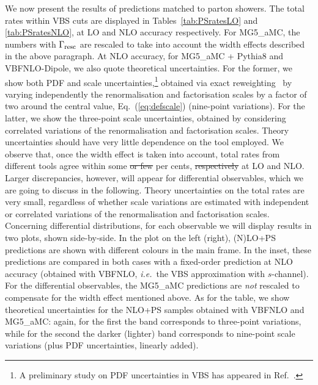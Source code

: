\documentclass[twocolumn,epjc3]{svjour3} %
\newlength{\width}
\providecommand{\DIFaddtex}[1]{{\protect\color{blue}\uwave{#1}}} %
\providecommand{\DIFdeltex}[1]{{\protect\color{red}\sout{#1}}}                      %
\providecommand{\DIFaddbegin}{} %
\providecommand{\DIFaddend}{} %
\providecommand{\DIFdelbegin}{} %
\providecommand{\DIFdelend}{} %
\providecommand{\DIFadd}[1]{\texorpdfstring{\DIFaddtex{#1}}{#1}} %
\providecommand{\DIFdel}[1]{\texorpdfstring{\DIFdeltex{#1}}{}} %
\begin{document}
We now present the results of predictions matched to parton showers.
The total rates within VBS cuts are displayed in Tables~\ref{tab:PSratesLO} and
\ref{tab:PSratesNLO}, at LO and NLO
accuracy respectively. For {\sc MG5\_aMC},
the numbers with $\Gamma_{\rm resc}$ are rescaled to
take into account the width effects described in the above paragraph. At NLO accuracy, for {\sc MG5\_aMC} + {\sc Pythia8} and {\sc VBFNLO}-{\sc Dipole}, we also quote
theoretical uncertainties.
For the former, we show both PDF and scale uncertainties,\footnote{A preliminary study on PDF uncertainties in VBS has appeared
in Ref.~\cite{Schwan:2017yy}.} obtained via exact reweighting~\cite{Frederix:2011ss} by varying independently the renormalisation and factorisation
scales by a factor of two around the central value, Eq.~(\ref{eq:defscale}) (nine-point variations).
For the latter, we show the
three-point scale uncertainties, obtained by considering correlated variations of the renormalisation and factorisation scales. Theory uncertainties should have very little dependence on the tool employed.
We observe that, once the width effect is taken into
account, total rates from different tools agree within some \DIFdelbegin \DIFdel{or few }\DIFdelend per cents, \DIFdelbegin \DIFdel{respectively }\DIFdelend \DIFaddbegin \DIFadd{both }\DIFaddend at LO and NLO. Larger discrepancies, however, will appear for differential observables, which we are going to discuss in
the following. Theory uncertainties on the total rates are very small, regardless of whether scale variations are estimated with 
independent or correlated variations of the renormalisation and factorisation scales.
Concerning differential distributions, for each observable we will display results in two plots, shown side-by-side. In the plot on the left (right), (N)LO+PS predictions are shown
with different colours in the main frame. In the inset, these predictions are compared in both cases with a fixed-order prediction at NLO accuracy (obtained with
{\sc VBFNLO}, \emph{i.e.}\ the VBS approximation with $s$-channel).
For the differential observables, the {\sc MG5\_aMC} predictions are \emph{not} rescaled to compensate for the width effect mentioned above. As for the table, we show theoretical uncertainties for the NLO+PS samples
obtained with {\sc VBFNLO} and {\sc MG5\_aMC}:
again, for the first the band corresponds to three-point variations, while for the second the darker (lighter) band corresponds to nine-point
scale variations (plus PDF uncertainties, linearly added).
\end{document}
